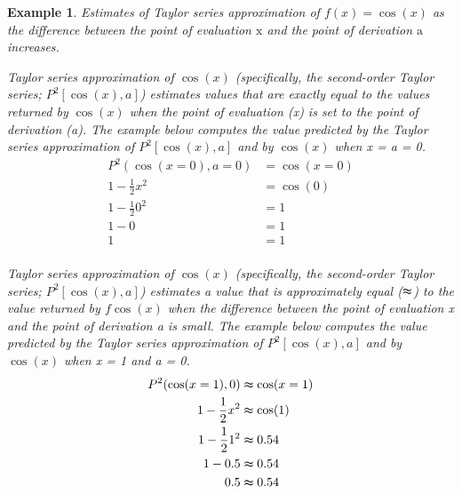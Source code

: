 \documentclass[
12pt, %
twoside,
english]{guelphthesis}
\newtheorem{example}{Example}
\begin{document}
\begin{example}
\protect\hypertarget{exm:taylor-estimates}{}\label{exm:taylor-estimates}Estimates of Taylor series approximation of \(f(x) = \cos(x)\) as the difference between the point of evaluation \(\mathrm{x}\) and the point of derivation \(\mathrm{a}\) increases.

\textup{Taylor series approximation of $\cos(x)$ (specifically, the second-order Taylor series; $P^2[\cos(x), a]$) estimates values that are exactly equal to the values returned by $\cos(x)$ when the point of evaluation (\textit{x}) is set to the point of derivation (\textit{a}). The example below computes the value predicted by the Taylor series approximation of $P^2[\cos(x), a]$ and by $\cos(x)$ when \textit{x} = \textit{a} = 0.}
\begin{align*}
P^2(\cos(x=0), a=0) &= \cos(x=0) \nonumber \\ 
1- \frac{1}{2}x^2 &=  \cos(0) \nonumber \\ 
1- \frac{1}{2}0^2 &=  1 \nonumber \\ 
1- 0 &=  1 \nonumber \\ 
1 &=  1 \nonumber \\ 
\end{align*}
\vspace*{-25mm}

\textup{Taylor series approximation of $\cos(x)$ (specifically, the second-order Taylor series; $P^2[\cos(x), a]$) estimates a value that is approximately equal ($\thickapprox$) to the value returned by $f\cos(x)$ when the difference between the point of evaluation \textit{x} and the point of derivation \textit{a} is small. The example below computes the value predicted by the Taylor series approximation of $P^2[\cos(x), a]$ and by $\cos(x)$ when \textit{x} = 1 and  \textit{a} = 0.}
\begin{align*}
P^2(\cos(x = 1), 0) &\thickapprox \cos(x = 1) \nonumber \\ 
1- \frac{1}{2}x^2 &\thickapprox   \cos(1) \nonumber \\ 
1- \frac{1}{2}1^2 &\thickapprox   0.54 \nonumber \\ 
1- 0.5 &\thickapprox   0.54 \nonumber \\ 
0.5 &\thickapprox 0.54 \nonumber \\ 
\end{align*}
\vspace*{-25mm}


\end{example}
\end{document}
